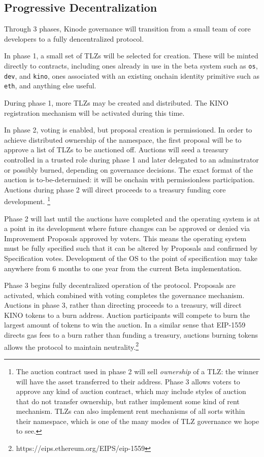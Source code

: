 \documentclass[runningheads]{llncs}
\begin{document}
\subsection{Progressive Decentralization}
\label{sec:daodecentralization}

Through 3 phases, Kinode governance will transition from a small team of core developers to a fully dencentralized protocol.

In phase 1, a small set of TLZs will be selected for creation. These will be minted directly to contracts, including ones already in use in the beta system such as \verb|os|, \verb|dev|, and \verb|kino|, ones associated with an existing onchain identity primitive such as \verb|eth|, and anything else useful.

During phase 1, more TLZs may be created and distributed.
The KINO registration mechanism will be activated during this time.

In phase 2, voting is enabled, but proposal creation is permissioned.
In order to achieve distributed ownership of the namespace, the first proposal will be to approve a list of TLZs to be auctioned off.
Auctions will seed a treasury controlled in a trusted role during phase 1 and later delegated to an adminstrator or possibly burned, depending on governance decisions.
The exact format of the auction is to-be-determined: it will be onchain with permissionless participation.
Auctions during phase 2 will direct proceeds to a treasury funding core development.
\footnote{The auction contract used in phase 2 will sell \textit{ownership} of a TLZ: the winner will have the asset transferred to their address.
Phase 3 allows voters to approve any kind of auction contract, which may include styles of auction that do not transfer ownership, but rather implement some kind of rent mechanism.
TLZs can also implement rent mechanisms of all sorts within their namespace, which is one of the many modes of TLZ governance we hope to see.}

Phase 2 will last until the auctions have completed and the operating system is at a point in its development where future changes can be approved or denied via Improvement Proposals approved by voters.
This means the operating system must be fully specified such that it can be altered by Proposals and confirmed by Specification votes.
Development of the OS to the point of specification may take anywhere from 6 months to one year from the current Beta implementation.

Phase 3 begins fully decentralized operation of the protocol.
Proposals are activated, which combined with voting completes the governance mechanism.
Auctions in phase 3, rather than directing proceeds to a treasury, will direct KINO tokens to a burn address.
Auction participants will compete to burn the largest amount of tokens to win the auction.
In a similar sense that EIP-1559 directs gas fees to a burn rather than funding a treasury, auctions burning tokens allows the protocol to maintain neutrality.\footnote{https://eips.ethereum.org/EIPS/eip-1559}
\end{document}
